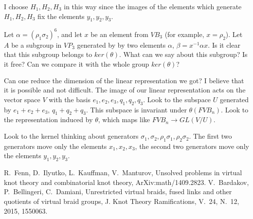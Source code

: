 \documentclass{article}
\begin{document}
I choose $H_1,H_2,H_3$ in this way since the images of the elements which generate $H_1,H_2,H_3$ fix the elements $y_1,y_2,y_3$. 

Let $\alpha=(\rho_1\sigma_2)^6$, and let $x$ be an element from $VB_3$ (for example, $x=\rho_2$). Let $A$ be a subgroup in $VP_3$ generated by by two elements $\alpha$, $\beta=x^{-1}\alpha x$. Is it clear that this subgroup belongs to $ker(\theta)$. What can we say about this subgroup? Is it free? Can we compare it with the whole group $ker(\theta)$?

Can one reduce the dimension of the linear representation we got? I believe that it is possible and not difficult. The image of our linear representation acts on the vector space $V$ with the basis $e_1,e_2,e_3,q_1,q_2,q_3$. Look to the subspace $U$ generated by $e_1+e_2+e_3$, $q_1+q_2+q_3$. This subspace is invariant under $\theta(FVB_n)$. Look to the representation induced by $\theta$, which maps like $FVB_n\to GL(V/U)$.

Look to the kernel thinking about generators $\sigma_1, \sigma_2, \rho_1\sigma_1,\rho_2\sigma_2$. The first two generators move only the elements $x_1,x_2,x_3$, the second two generators move only the elements $y_1,y_2,y_3$.

\begin{thebibliography}{00}
R.~Fenn, D.~Ilyutko, L.~Kauffman, V.~Manturov, Unsolved problems in virtual knot theory and combinatorial knot theory, ArXiv:math/1409.2823.
V.~Bardakov, P.~Bellingeri, C.~Damiani, Unrestricted virtual braids, fused links and other quotients of virtual braid groups, J. Knot Theory Ramifications, V.~24, N.~12, 2015, 1550063.
\end{thebibliography}
\end{document}
